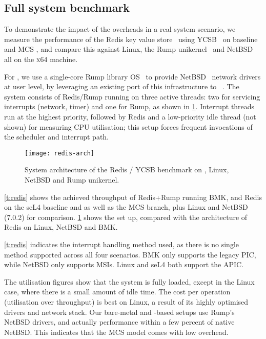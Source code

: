 \subsection{Full system benchmark}
\label{s:evaluation-redis-overhead}

To demonstrate the impact of the overheads in a real system scenario, 
we measure the performance of the Redis key value store~\citep{redis:url} using 
\gls{YCSB}~\citep{Cooper_STRS_10} on baseline and MCS \selfour, and compare this
against Linux, the Rump unikernel~\citep{Kantee_Cormack_14} and 
NetBSD~\citep{NetBSD:url} all on the \textsc{x64} machine.

For \selfour, we use a single-core Rump library OS~\citep{Kantee_Cormack_14} to provide 
NetBSD~\citep{NetBSD:url} network drivers at user level, by leveraging an existing port of this infrastructure
to \selfour~\citep{McCleod:be}.
The system consists of Redis/Rump running on three active \selfour threads: 
two for servicing interrupts (network, timer) and one for Rump, as shown in
\cref{f:redis-arch}. Interrupt threads run at the highest priority,
followed by Redis and a low-priority idle thread (not shown) for measuring CPU utilisation;
this setup forces frequent invocations of the scheduler and interrupt path.

 \begin{figure}[ht]
    \centering
    \texttt{[image: redis-arch]}
    \caption[System architecture of Redis benchmark.]{System architecture of the Redis / \gls{YCSB} benchmark on \selfour, 
        Linux, NetBSD and Rump unikernel.}
    \label{f:redis-arch}
\end{figure}

\cref{t:redis} shows the achieved throughput of Redis+Rump
running \gls{BMK}, and Redis on the seL4 baseline and as well as the MCS
branch, plus Linux and NetBSD (7.0.2) for comparison. \cref{f:redis-arch} shows the \selfour set up,
compared with the architecture of Redis on Linux, NetBSD and \gls{BMK}. 

\cref{t:redis} indicates the interrupt handling method used, as there is no single method supported
across all four scenarios. \gls{BMK} only supports the legacy
\gls{PIC},
while NetBSD only supports \glspl{MSI}. Linux and seL4 both support the
\gls{APIC}.

The utilisation figures show that the system is fully loaded, except
in the Linux case, where there is a small amount of idle time. The
cost per operation (utilisation over throughput) is best on Linux, a
result of its highly optimised drivers and network stack. Our
bare-metal and \selfour-based setups use Rump's NetBSD drivers, and
actually performance within a few percent of native NetBSD. This
indicates that the MCS model comes with low overhead.


